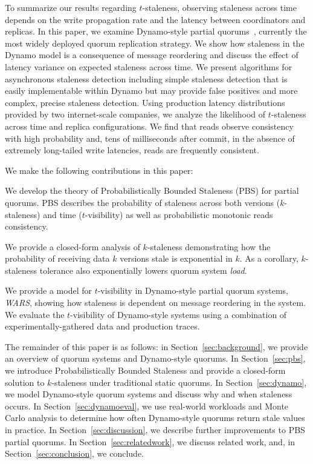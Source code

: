 \documentclass{vldb}
\begin{document}
To summarize our results regarding $t$-staleness, observing staleness
across time depends on the write propagation rate and the latency
between coordinators and replicas.  In this paper, we examine
Dynamo-style partial quorums~\cite{dynamo}, currently the most widely
deployed quorum replication strategy.  We show how staleness in the
Dynamo model is a consequence of message reordering and discuss the
effect of latency variance on expected staleness across time.  We
present algorithms for asynchronous staleness detection including
simple staleness detection that is easily implementable within Dynamo
but may provide false positives and more complex, precise staleness
detection. Using production latency distributions provided by two
internet-scale companies, we analyze the likelihood of $t$-staleness
across time and replica configurations.  We find that reads observe
consistency with high probability and, tens of milliseconds after
commit, in the absence of extremely long-tailed write latencies, reads
are frequently consistent.

We make the following contributions in this paper:

\begin{itemize*}

\item We develop the theory of Probabilistically Bounded Staleness
  (PBS) for partial quorums. PBS describes the probability of
  staleness across both versions ($k$-staleness) and time
  ($t$-visibility) as well as probabilistic monotonic reads
  consistency.

\item We provide a closed-form analysis of $k$-staleness demonstrating
  how the probability of receiving data $k$ versions stale is
  exponential in $k$.  As a corollary, $k$-staleness tolerance also
  exponentially lowers quorum system \textit{load}.

\item We provide a model for $t$-visibility in
  Dynamo-style partial quorum systems, \textit{WARS},  showing how
  staleness is dependent on message reordering in the system.  We
  evaluate the $t$-visibility of Dynamo-style systems using a
  combination of experimentally-gathered data and production traces.

\end{itemize*}

The remainder of this paper is as follows: in
Section~\ref{sec:background}, we provide an overview of quorum systems
and Dynamo-style quorums.  In Section~\ref{sec:pbs}, we introduce
Probabilistically Bounded Staleness and provide a closed-form solution
to $k$-staleness under traditional static quorums.  In
Section~\ref{sec:dynamo}, we model Dynamo-style quorum systems and
discuss why and when staleness occurs.  In Section~\ref{sec:dynamoeval}, we
use real-world workloads and Monte Carlo analysis to determine how
often Dynamo-style quorums return stale values in practice.  In
Section~\ref{sec:discussion}, we describe further improvements to
PBS partial quorums. In Section~\ref{sec:relatedwork}, we discuss
related work, and, in Section~\ref{sec:conclusion}, we conclude.
\end{document}
